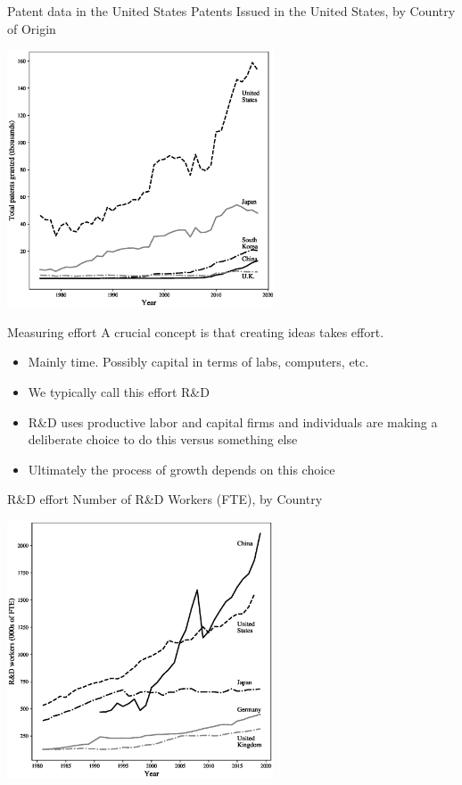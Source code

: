 \begin{frame}{Patent data in the United States}
Patents Issued in the United States, by Country of Origin
\begin{center}
\includegraphics[height = 3in]{../Figures/fig-ch4-fig1.eps}
\end{center}
\end{frame}

\begin{frame}{Measuring effort}
A crucial concept is that creating ideas takes effort. 
\begin{itemize}
	\item Mainly time. Possibly capital in terms of labs, computers, etc. 
	\item We typically call this effort R\&D
	\item R\&D uses productive labor and capital firms and individuals are making a deliberate choice to do this versus something else
	\item Ultimately the process of growth depends on this choice
\end{itemize}
\end{frame}

\begin{frame}{R\&D effort}
Number of R\&D Workers (FTE), by Country
\begin{center}
\includegraphics[height = 3in]{../Figures/fig-ch4-fig2.eps}
\end{center}
\end{frame}

